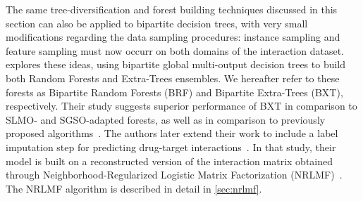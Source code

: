 The same tree-diversification and forest building techniques discussed in this section can also be applied to bipartite decision trees, with very small modifications regarding the data sampling procedures: instance sampling and feature sampling must now occurr on both domains of the interaction dataset.
%
\cite{pliakos2019network} explores these ideas, using bipartite global multi-output decision trees to build both Random Forests and Extra-Trees ensembles. We hereafter refer to these forests as Bipartite Random Forests (BRF) and Bipartite Extra-Trees (BXT), respectively. Their study suggests superior performance of BXT in comparison to SLMO- and SGSO-adapted forests, as well as in comparison to previously proposed algorithms~\cite{pliakos2019network}. %
%
The authors later extend their work to include a label imputation step for predicting drug-target interactions~\cite{pliakos2020drugtarget}. In that study, their model is built on a reconstructed version of the interaction matrix obtained through Neighborhood-Regularized Logistic Matrix Factorization (NRLMF)~\cite{liu2016neighborhood}. The NRLMF algorithm is described in detail in \autoref{sec:nrlmf}.






